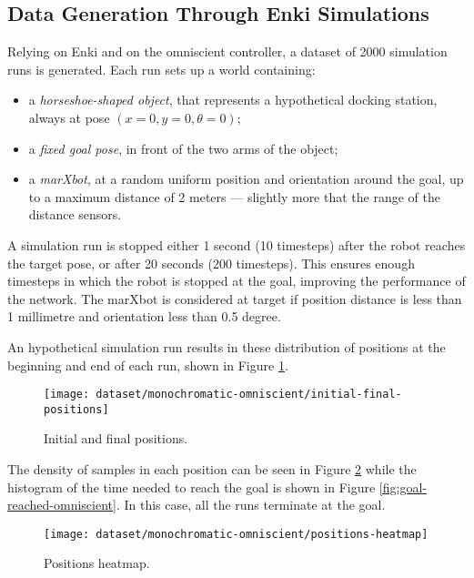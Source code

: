 \subsection{Data Generation Through Enki Simulations}
Relying on Enki and on the omniscient controller, a dataset of 2000 simulation 
runs is generated. 
Each run sets up a world containing:
\begin{itemize}
	\item a \emph{horseshoe-shaped object}, that represents a hypothetical 
	docking 
	station, always at pose $(x=0, y=0, \theta=0)$;
	\item a \emph{fixed goal pose}, in front of the two arms of the object;
	\item a \emph{marXbot}, at a random uniform position and orientation 
	around the 
	goal, up to a maximum distance of 2 meters --- slightly more that the range 
	of the distance sensors.
\end{itemize}

A simulation run is stopped either 1 second (10 timesteps) after the robot 
reaches the target pose, or after 20 seconds (200 timesteps). This ensures 
enough timesteps in which the robot is stopped at the goal, improving 
the performance of the network. The marXbot is considered at target if position 
distance is less than 1 millimetre and orientation less than 0.5 degree.

An hypothetical simulation run results in these distribution of positions at 
the beginning and end of each run, shown in Figure 
\ref{fig:initial-final-positions-omniscient}.

\begin{figure}[htbp]
\centerline{\texttt{[image: dataset/monochromatic-omniscient/initial-final-positions]}}
	\caption{Initial and final positions.}
	\label{fig:initial-final-positions-omniscient}
\end{figure}

The density of samples in each position can be seen in Figure 
\ref{fig:densisy-omniscient} while the histogram of the time needed to reach 
the goal is shown in Figure \ref{fig:goal-reached-omniscient}. In this case, 
all the runs terminate at the goal.

\begin{figure}[htbp]
\centerline{\texttt{[image: dataset/monochromatic-omniscient/positions-heatmap]}}
	\caption{Positions heatmap.}
	\label{fig:densisy-omniscient}
\end{figure}

